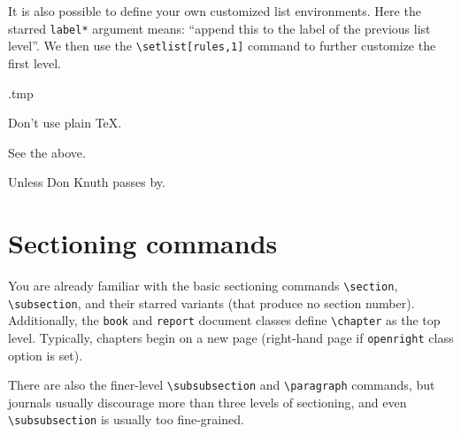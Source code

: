It is also possible to define your own customized list environments.
Here the starred \verb|label*| argument means: ``append this to the label of the previous list level''.
We then use the \verb|\setlist[rules,1]| command to further customize the first level.
\begin{VerbatimOut}{\jobname.tmp}

\begin{rules}
\item Don't use plain \TeX.
\item See the above.
\begin{rules}
\item Unless Don Knuth passes by.
\end{rules}
\end{rules}
\end{VerbatimOut}
\ShowExample


%
%
%
\section{Sectioning commands}

You are already familiar with the basic sectioning commands
\verb|\section|, \verb|\subsection|, and their starred variants (that produce no section number).
Additionally, the \verb|book| and \verb|report| document classes
define \verb|\chapter| as the top level.
Typically, chapters begin on a new page (right-hand page if \verb|openright| class option is set).

There are also the finer-level \verb|\subsubsection| and \verb|\paragraph| commands,
but journals usually discourage more than three levels of sectioning,
and even \verb|\subsubsection| is usually too fine-grained.

